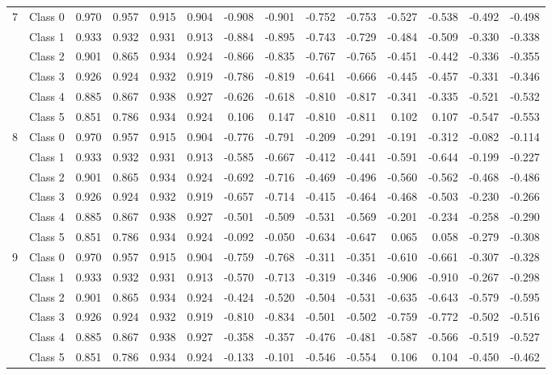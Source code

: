 \begin{table*}[t]
\begin{tabular}{l|l|rrrr|rrrr|rrrr}
\midrule
\multirow{6}{*}{7} 
&Class 0 & 0.970 & 0.957 & 0.915 & 0.904 & -0.908 & -0.901 & -0.752 & -0.753 & -0.527 & -0.538 & -0.492 & -0.498 \\
&Class 1 & 0.933 & 0.932 & 0.931 & 0.913 & -0.884 & -0.895 & -0.743 & -0.729 & -0.484 & -0.509 & -0.330 & -0.338 \\
&Class 2 & 0.901 & 0.865 & 0.934 & 0.924 & -0.866 & -0.835 & -0.767 & -0.765 & -0.451 & -0.442 & -0.336 & -0.355 \\
&Class 3 & 0.926 & 0.924 & 0.932 & 0.919 & -0.786 & -0.819 & -0.641 & -0.666 & -0.445 & -0.457 & -0.331 & -0.346 \\
&Class 4 & 0.885 & 0.867 & 0.938 & 0.927 & -0.626 & -0.618 & -0.810 & -0.817 & -0.341 & -0.335 & -0.521 & -0.532 \\
&Class 5 & 0.851 & 0.786 & 0.934 & 0.924 & 0.106 & 0.147 & -0.810 & -0.811 & 0.102 & 0.107 & -0.547 & -0.553 \\
\midrule
\multirow{6}{*}{8} 
&Class 0 & 0.970 & 0.957 & 0.915 & 0.904 & -0.776 & -0.791 & -0.209 & -0.291 & -0.191 & -0.312 & -0.082 & -0.114 \\
&Class 1 & 0.933 & 0.932 & 0.931 & 0.913 & -0.585 & -0.667 & -0.412 & -0.441 & -0.591 & -0.644 & -0.199 & -0.227 \\
&Class 2 & 0.901 & 0.865 & 0.934 & 0.924 & -0.692 & -0.716 & -0.469 & -0.496 & -0.560 & -0.562 & -0.468 & -0.486 \\
&Class 3 & 0.926 & 0.924 & 0.932 & 0.919 & -0.657 & -0.714 & -0.415 & -0.464 & -0.468 & -0.503 & -0.230 & -0.266 \\
&Class 4 & 0.885 & 0.867 & 0.938 & 0.927 & -0.501 & -0.509 & -0.531 & -0.569 & -0.201 & -0.234 & -0.258 & -0.290 \\
&Class 5 & 0.851 & 0.786 & 0.934 & 0.924 & -0.092 & -0.050 & -0.634 & -0.647 & 0.065 & 0.058 & -0.279 & -0.308 \\
\midrule
\multirow{6}{*}{9} 
&Class 0 & 0.970 & 0.957 & 0.915 & 0.904 & -0.759 & -0.768 & -0.311 & -0.351 & -0.610 & -0.661 & -0.307 & -0.328 \\
&Class 1 & 0.933 & 0.932 & 0.931 & 0.913 & -0.570 & -0.713 & -0.319 & -0.346 & -0.906 & -0.910 & -0.267 & -0.298 \\
&Class 2 & 0.901 & 0.865 & 0.934 & 0.924 & -0.424 & -0.520 & -0.504 & -0.531 & -0.635 & -0.643 & -0.579 & -0.595 \\
&Class 3 & 0.926 & 0.924 & 0.932 & 0.919 & -0.810 & -0.834 & -0.501 & -0.502 & -0.759 & -0.772 & -0.502 & -0.516 \\
&Class 4 & 0.885 & 0.867 & 0.938 & 0.927 & -0.358 & -0.357 & -0.476 & -0.481 & -0.587 & -0.566 & -0.519 & -0.527 \\
&Class 5 & 0.851 & 0.786 & 0.934 & 0.924 & -0.133 & -0.101 & -0.546 & -0.554 & 0.106 & 0.104 & -0.450 & -0.462 \\


\end{tabular}
\end{table*}
